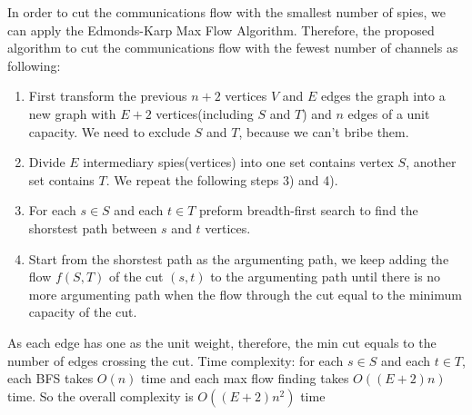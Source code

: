 \documentclass[a4paper]{scrartcl}
\begin{document}
\begin{enumerate}[label=(\alph{*})]
  In order to cut the communications flow with the smallest number of spies, we can apply the Edmonds-Karp Max Flow Algorithm. Therefore, the proposed algorithm to cut the communications flow with the fewest number of channels as following:
  \begin{enumerate}[label=\arabic{*})]
    \item First transform the previous $n+2$ vertices $V$ and $E$ edges the graph into a new graph with $E+2$ vertices(including $S$ and $T$) and $n$ edges of a unit capacity. We need to exclude $S$ and $T$, because we can't bribe them.
    \item Divide $E$ intermediary spies(vertices) into one set contains vertex $S$, another set contains $T$. We repeat the following steps 3) and 4).
    \item For each $s \in S$ and each $t \in T$ preform breadth-first search to find the shorstest path between $s$ and $t$ vertices.
    \item Start from the shorstest path as the argumenting path, we keep adding the flow $f(S,T)$ of the cut $(s,t)$ to the argumenting path until there is no more argumenting path when the flow through the cut equal to the minimum capacity of the cut.
  \end{enumerate}
  As each edge has one as the unit weight, therefore, the min cut equals to the number of edges crossing the cut.
   Time complexity: for each $s \in S$ and each $t \in T$, each BFS takes $O(n)$ time and each max flow finding takes $O((E+2)n)$ time. So the overall complexity is $O((E+2)n^2  )$ time
  \end{enumerate}
\end{document}
